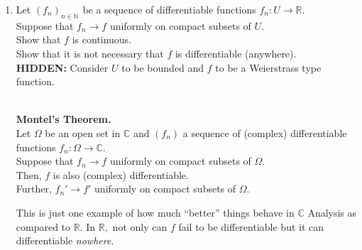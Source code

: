 \documentclass[12pt]{article}
\theoremstyle{definition}
\numberwithin{thm}{section}
\newtheorem{defn}[thm]{Definition}
\newcommand{\hint}[1]{\textbf{HIDDEN:} {\color[rgb]{0.95, 0.95, 0.95}#1}}
\newenvironment{blockquote}
{\begin{mdframed}[skipabove=0pt, skipbelow=0pt, innertopmargin=4pt, innerbottommargin=4pt, bottomline=false,topline=false,rightline=false, linewidth=2pt]}
{\end{mdframed}}
\begin{document}
\begin{enumerate}
	\begin{defn}[Power series representation]
		\begin{blockquote}
		A function $f:U \to \mathbb{R}$ is said to \emph{admit a power series representation at $x_0$} exists a neighbourhood $B_r(x_0) \subset U$ and a sequence of real numbers $(a_n)$ such that 
		\begin{equation*} 
			f(x) = a_0 + a_1(x - x_0) + a_2(x - x_0)^2 + \cdots
		\end{equation*}
		for all $x \in B_r(x_0).$\\~\\
		An entirely analogous definition is there for $f:\Omega \to \mathbb{C}$ as well.
		\end{blockquote}
	\end{defn}
	It can be shown that such a function must be infinitely differentiable at $x_0$ and that $a_n = \dfrac{f^{(n)}(x_0)}{n!}.$\\~\\
	Construct a function $f:U \to \mathbb{R}$ which is infinitely differentiable but there exists $x_0 \in U$ such that $f$ does not admit a power series representation at $x_0.$\\
	(In fact, one can find a function which does not admit a power series representation \emph{anywhere}.)\\
	\begin{blockquote}	
		Let $f:\Omega \to \mathbb{C}$ be complex differentiable. \\
		Then, for every $z_0 \in \Omega,$ $f$ admits a power series representation. Moreover, this representation is valid on the largest open disc centered at $z_0$ contained in $\Omega.$
	\end{blockquote}
	\item Let $(f_n)_{n \in \mathbb{N}}$ be a sequence of differentiable functions $f_n:U \to \mathbb{R}.$\\
	Suppose that $f_n\to f$ uniformly on compact subsets of $U.$\\
	Show that $f$ is continuous.\\
	Show that it is not necessary that $f$ is differentiable (anywhere).\\
	\hint{Consider $U$ to be bounded and $f$ to be a Weierstrass type function.}\\~\\
	\begin{blockquote}
		\textbf{Montel's Theorem.}\\
		Let $\Omega$ be an open set in $\mathbb{C}$ and $(f_n)$ a sequence of (complex) differentiable functions $f_n:\Omega \to \mathbb{C}.$\\
		Suppose that $f_n\to f$ uniformly on compact subsets of $\Omega.$\\
		Then, $f$ is also (complex) differentiable.\\
		Further, $f_n' \to f'$ uniformly on compact subsets of $\Omega.$
	\end{blockquote}
	This is just one example of how much ``better'' things behave in $\mathbb{C}$ Analysis as compared to $\mathbb{R}.$ In $\mathbb{R},$ not only can $f$ fail to be differentiable but it can differentiable \emph{nowhere}.
\end{enumerate}
\end{document}
